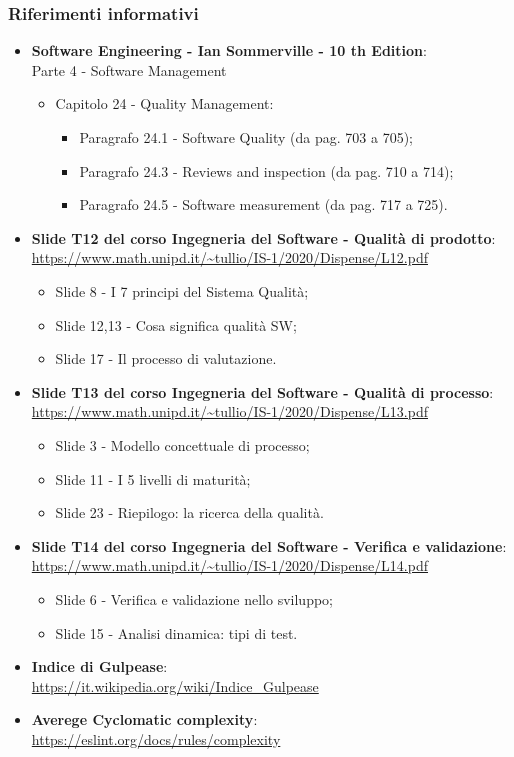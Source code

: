 \subsubsection{Riferimenti informativi}
\begin{itemize}
	\item \textbf{Software Engineering - Ian Sommerville - 10 th Edition}: \\
	Parte 4 - Software Management
	\begin{itemize}
	\item Capitolo 24 - Quality Management:
		\begin{itemize}
			\item Paragrafo 24.1 - Software Quality (da pag. 703 a 705);
			\item Paragrafo 24.3 - Reviews and inspection (da pag. 710 a 714);
			\item Paragrafo 24.5 - Software measurement (da pag. 717 a 725).
		\end{itemize}
	\end{itemize}
	
	\item \textbf{Slide T12 del corso Ingegneria del Software - Qualità di prodotto}:\\
	\textcolor{blue}{\url{https://www.math.unipd.it/~tullio/IS-1/2020/Dispense/L12.pdf}}
	\begin{itemize}
		\item Slide 8 - I 7 principi del Sistema Qualità;
		\item Slide 12,13 - Cosa significa qualità SW;
		\item Slide 17 - Il processo di valutazione.
	\end{itemize}
	
	\item \textbf{Slide T13 del corso Ingegneria del Software - Qualità di processo}:\\
	\textcolor{blue}{\url{https://www.math.unipd.it/~tullio/IS-1/2020/Dispense/L13.pdf}}
		\begin{itemize}
		\item Slide 3 - Modello concettuale di processo;
		\item Slide 11 - I 5 livelli di maturità;
		\item Slide 23 - Riepilogo: la ricerca della qualità.
	\end{itemize}
	
	\item \textbf{Slide T14 del corso Ingegneria del Software - Verifica e validazione}:\\
	\textcolor{blue}{\url{https://www.math.unipd.it/~tullio/IS-1/2020/Dispense/L14.pdf}}
	\begin{itemize}
		\item Slide 6 - Verifica e validazione nello sviluppo; 
		\item Slide 15 - Analisi dinamica: tipi di test.
	\end{itemize}
	
	\item \textbf{Indice di Gulpease}:\\
	\textcolor{blue}{\url{https://it.wikipedia.org/wiki/Indice_Gulpease}}
	
	\item \textbf{Averege Cyclomatic complexity}:\\
	\textcolor{blue}{\url{https://eslint.org/docs/rules/complexity}}
	
\end{itemize}